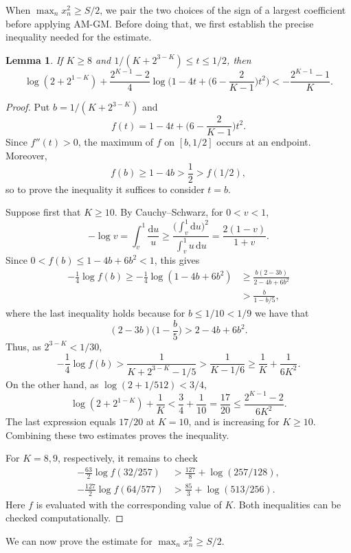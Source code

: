 \documentclass[reqno,12pt]{amsart}
\newtheorem{lemma}[theorem]{Lemma}
\theoremstyle{remark}
\begin{document}
When $\max_n x_n^2\geq S/2$, we pair the two choices of the sign of a largest coefficient before applying AM-GM. Before doing that, we first establish the precise inequality needed for the estimate.

\begin{lemma}\label{lemma scalar comparison}
If $K\geq 8$ and $1/(K+2^{3-K})\leq t\leq1/2$, then
$$ \log(2+2^{1-K})+\frac{2^{K-1}-2}{4} \log\bigg(1-4t+\bigg(6-\frac2{K-1}\bigg)t^2\bigg) < -\frac{2^{K-1}-1}{K}. $$
\end{lemma}
\begin{proof}
Put $b=1/(K+2^{3-K})$ and
$$ f(t)=1-4t+\bigg(6-\frac2{K-1}\bigg)t^2. $$
Since $f''(t)>0$, the maximum of $f$ on $[b,1/2]$ occurs at an endpoint. Moreover,
$$ f(b) \geq 1-4b > \frac{1}{2} > f(1/2), $$
so to prove the inequality it suffices to consider $t=b$.

Suppose first that $K\geq10$. By Cauchy--Schwarz, for $0<v<1$,
$$ -\log v=\int_v^1\frac{\mathrm{d}u}{u} \geq\frac{\big(\int_v^1 \mathrm{d}u\big)^2}{\int_v^1 u\,\mathrm{d}u} = \frac{2(1-v)}{1+v}. $$
Since $0 < f(b) \leq 1-4b+6b^2<1$, this gives
\begin{align*}
 -\frac{1}{4}\log f(b) \geq -\frac{1}{4}\log(1-4b+6b^2) &\geq \frac{b(2-3b)}{2-4b+6b^2} \\
 &> \frac{b}{1-b/5},
\end{align*}
where the last inequality holds because for $b\leq1/10<1/9$ we have that
$$(2-3b)\bigg(1-\frac{b}{5}\bigg)>2-4b+6b^2.$$
Thus, as $2^{3-K} < 1/30$,
$$ -\frac{1}{4}\log f(b) > \frac{1}{K+2^{3-K}-1/5} > \frac{1}{K-1/6} \geq\frac{1}{K}+\frac1{6K^2}. $$
On the other hand, as $\log(2 + 1/512) < 3/4$,
$$ \log(2+2^{1-K})+\frac{1}{K} < \frac{3}{4}+\frac{1}{10} = \frac{17}{20} \leq\frac{2^{K-1}-2}{6K^2}. $$
The last expression equals $17/20$ at $K=10$, and is increasing for $K\geq 10$. Combining these two estimates proves the inequality.

For $K=8,9$, respectively, it remains to check
\begin{align*}
-\frac{63}{2}\log f(32/257) &>\frac{127}{8}+\log(257/128),\\
-\frac{127}{2}\log f(64/577) &>\frac{85}{3}+\log(513/256).
\end{align*}
Here $f$ is evaluated with the corresponding value of $K$. Both inequalities can be checked computationally.
\end{proof}

We can now prove the estimate for $\max_n x_n^2\geq S/2$.
\end{document}
